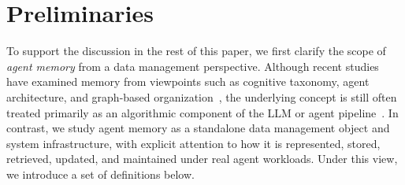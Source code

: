 \section{Preliminaries}
\label{sec:def}

To support the discussion in the rest of this paper, we first clarify the scope of \emph{agent memory} from a data management perspective. Although recent studies have examined memory from viewpoints such as cognitive taxonomy, agent architecture, and graph-based organization~\cite{zhang2024survey,du2026memory,hu2025memory,wu2026memoryeab,tang2026survey,yang2026graph}, the underlying concept is still often treated primarily as an algorithmic component of the LLM or agent pipeline~\cite{zhang2024survey,du2026memory,hu2025memory}. In contrast, we study agent memory as a standalone data management object and system infrastructure, with explicit attention to how it is represented, stored, retrieved, updated, and maintained under real agent workloads. Under this view, we introduce a set of definitions below.


